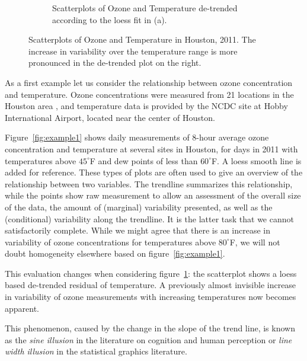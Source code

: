 \documentclass[11pt]{isuthesis}\usepackage[]{graphicx}\usepackage[]{color}
\begin{document}
\begin{figure}[h!tbp]
\begin{subfigure}[b]{.45\textwidth}
  \caption[Residual Ozone]{\small Scatterplots of Ozone and Temperature de-trended according to the loess fit in (a). \\ \phantom{text to get to the next line}
  \label{fig:example2}}
\end{subfigure}
\caption[Scatterplots of Ozone and Temperature in Houston, 2011]{\label{fig:exampleFull1} Scatterplots of Ozone and Temperature in Houston, 2011. The increase in variability over the temperature range is more pronounced in the de-trended plot on the right.}
\end{figure}

As a first example let us consider the relationship between ozone concentration and temperature. Ozone concentrations were measured from 21 locations in the Houston area \citep{epa}, and temperature data is provided by the NCDC \citep{noaa} site at Hobby International Airport, located near the center of Houston. 

Figure~\ref{fig:example1} shows daily measurements of 8-hour average ozone concentration and temperature at several sites in Houston, for days in 2011 with temperatures above $45^\circ$F  and dew points of less than $60^\circ$F. 
A loess smooth line is added for reference. 
These types of plots are often used to give an overview of the relationship between two variables. The trendline summarizes this relationship, while the points show raw measurement to allow an assessment of the overall size of the data, the amount of (marginal) variability presented, as well as the (conditional) variability along the trendline. It is the latter task that we cannot satisfactorily complete. While
we might agree that there is an increase in variability of ozone concentrations for temperatures above $80^\circ$F, we will not doubt homogeneity  elsewhere based on figure~\ref{fig:example1}. 


This evaluation changes when considering figure~\ref{fig:example2}: the scatterplot shows a loess based de-trended residual of temperature. A previously almost invisible increase in variability of ozone measurements with increasing temperatures now becomes apparent.

This phenomenon, caused by the change in the slope of the trend line,  is  known as the  {\it sine illusion} in the literature on cognition and human perception  or {\it line width illusion} in the statistical graphics literature. 
\end{document}
